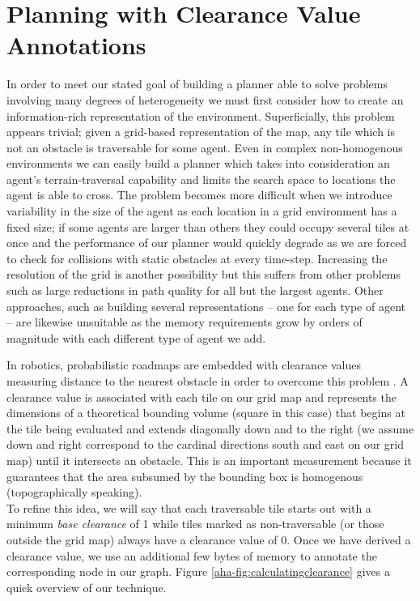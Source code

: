 \section{Planning with Clearance Value Annotations}
\label{aha:annotations}
In order to meet our stated goal of building a planner able to solve problems involving many degrees of heterogeneity we must first consider how to create an information-rich representation of the environment. Superficially, this problem appears trivial; given a grid-based representation of the map, any tile which is not an obstacle is traversable for some agent. Even in complex non-homogenous environments we can easily build a planner which takes into consideration an agent's terrain-traversal capability and limits the search space to locations the agent is able to cross.
The problem becomes more difficult when we introduce variability in the size of the agent as each location in a grid environment has a fixed size; if some agents are larger than others they could occupy several tiles at once and the performance of our planner would quickly degrade as we are forced to check for collisions with static obstacles at every time-step. Increasing the resolution of the grid is another possibility but this suffers from other problems such as large reductions in path quality for all but the largest agents. Other approaches, such as building several representations -- one for each type of agent -- are likewise unsuitable as the memory requirements grow by orders of magnitude with each different type of agent we add. \\ \newline

In robotics, probabilistic roadmaps are embedded with clearance values measuring distance to the nearest obstacle in order to overcome this problem \cite{geraerts04}. 
A clearance value is associated with each tile on our grid map and represents the dimensions of a theoretical bounding volume (square in this case) that begins at the tile being evaluated and extends diagonally down and to the right (we assume down and right correspond to the cardinal directions south and east on our grid map) until it intersects an obstacle. This is an important measurement because it guarantees that the area subsumed by the bounding box is homogenous (topographically speaking). \\ \newline
To refine this idea, we will say that each traversable tile starts out with a minimum \emph{base clearance} of 1 while tiles marked as non-traversable (or those outside the grid map) always have a clearance value of 0. Once we have derived a clearance value, we use an additional few bytes of memory to annotate the corresponding node in our graph. Figure \ref{aha-fig:calculatingclearance} gives a quick overview of our technique.

